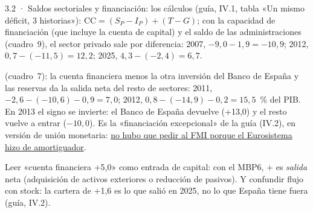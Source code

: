 \begin{complemento}{3.2 · Saldos sectoriales y financiación: los cálculos}
 (guía, IV.1, tabla «Un mismo déficit, 3 historias»): $\mathrm{CC}=(S_P-I_P)+(T-G)$; con la capacidad de financiación (que incluye la cuenta de capital) y el saldo de las administraciones (cuadro~9), el sector privado sale por diferencia: 2007, $-9{,}0-1{,}9=-10{,}9$; 2012, $0{,}7-(-11{,}5)=12{,}2$; 2025, $4{,}3-(-2{,}4)=6{,}7$.

\begin{figuracaja}
\caption{España: capacidad o necesidad de financiación por sectores (\% del PIB)}\label{fig:s05}
\end{figuracaja}

 (cuadro~7): la cuenta financiera menos la otra inversión del Banco de España y las reservas da la salida neta del resto de sectores: 2011, $-2{,}6-(-10{,}6)-0{,}9=7{,}0$; 2012, $0{,}8-(-14{,}9)-0{,}2=15{,}5$~\% del PIB. En 2013 el signo se invierte: el Banco de España devuelve (+13,0) y el resto vuelve a entrar ($-10{,}0$). Es la «financiación excepcional» de la guía (IV.2), en versión de unión monetaria: \uline{no hubo que pedir al FMI porque el Eurosistema hizo de amortiguador}.

 Leer «cuenta financiera +5,0» como entrada de capital: con el MBP6, + es \emph{salida} neta (adquisición de activos exteriores o reducción de pasivos). Y confundir flujo con stock: la cartera de +1,6 es lo que salió en 2025, no lo que España tiene fuera (guía, IV.2).
\end{complemento}
